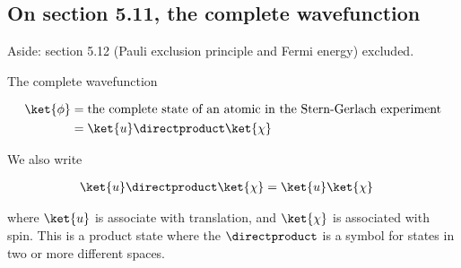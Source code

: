 \subsection{On section 5.11, the complete wavefunction}

Aside: section 5.12 (Pauli exclusion principle and Fermi energy) excluded.

The complete wavefunction

\begin{align*}
\ket{\phi} &= \text{the complete state of an atomic in the Stern-Gerlach experiment} \\
&=
\ket{u} \directproduct \ket{\chi}
\end{align*}

We also write

\begin{align}\label{eqn:PHY356Foct26:200}
\ket{u} \directproduct \ket{\chi}  &= \ket{u} \ket{\chi}
\end{align}

where $\ket{u}$ is associate with translation, and $\ket{\chi}$ is associated with spin.  This is a product state where the $\directproduct$ is a symbol for states in two or more different spaces.
